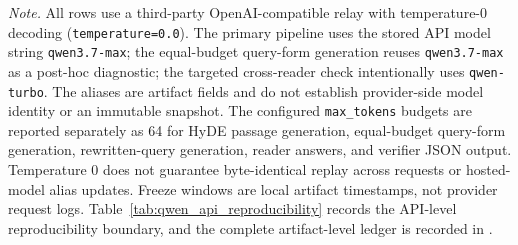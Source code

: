 \noindent\emph{Note.} All rows use a third-party OpenAI-compatible relay with temperature-0 decoding (\texttt{temperature=0.0}). The primary pipeline uses the stored API model string \texttt{qwen3.7-max}; the equal-budget query-form generation reuses \texttt{qwen3.7-max} as a post-hoc diagnostic; the targeted cross-reader check intentionally uses \texttt{qwen-turbo}. The aliases are artifact fields and do not establish provider-side model identity or an immutable snapshot. The configured \texttt{max\_tokens} budgets are reported separately as 64 for HyDE passage generation, equal-budget query-form generation, rewritten-query generation, reader answers, and verifier JSON output. Temperature 0 does not guarantee byte-identical replay across requests or hosted-model alias updates. Freeze windows are local artifact timestamps, not provider request logs. Table~\ref{tab:qwen_api_reproducibility} records the API-level reproducibility boundary, and the complete artifact-level ledger is recorded in .
\endgroup
